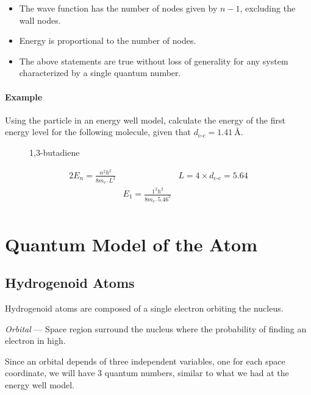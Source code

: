 \documentclass[10pt]{article}
\begin{document}
\begin{itemize}
	\item The wave function has the number of nodes given by $n-1$, excluding the wall nodes.
	\item Energy is proportional to the number of nodes.
	\item The above statements are true without loss of generality for any system characterized by a single quantum number.
\end{itemize}

\paragraph{Example}
Using the particle in an energy well model, calculate the energy of the first energy
level for the following molecule, given that $d_{\text{c-c}}=\SI{1.41}{\angstrom}$.

\begin{figure}[H]
	\centering
	{1,3-butadiene}\label{fig:butadiene}
\end{figure}
\begin{alignat*}{2}
	E_n = \frac{n^2h^2}{8m_{e^{-}}L^2} &                                       & L=4\times d_{\text{c-c}}=5.64 \\
	                                   & E_1 = \frac{1^2h^2}{8m_{e^{-}}5.46^2} &                               \\
\end{alignat*}
\clearpage
\section{Quantum Model of the Atom}
\subsection{Hydrogenoid Atoms}
Hydrogenoid atoms are composed of a single electron orbiting the nucleus.

\emph{Orbital} --- Space region surround the nucleus where the probability of
finding an electron in high.

Since an orbital depends of three independent variables, one for each space
coordinate, we will have 3 quantum numbers, similar to what we had at the energy
well model.
\end{document}
